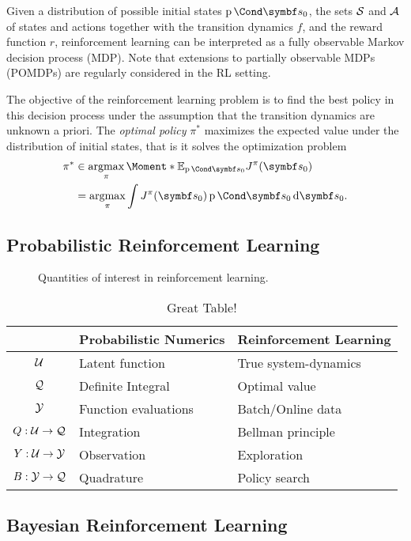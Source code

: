 Given a distribution of possible initial states $\Prob{\mat{s}_0}$, the sets $\mathcal{S}$ and $\mathcal{A}$ of states and actions together with the transition dynamics $f$, and the reward function $r$, reinforcement learning can be interpreted as a fully observable Markov decision process (MDP).
Note that extensions to partially observable MDPs (POMDPs) are regularly considered in the RL setting.

The objective of the reinforcement learning problem is to find the best policy in this decision process under the assumption that the transition dynamics are unknown a priori.
The \emph{optimal policy} $\pi^*$ maximizes the expected value under the distribution of initial states, that is it solves the optimization problem
\begin{align}
    \label{eq:optimal_policy}
    \begin{split}
        \pi^\ast &\in \argmax_{\pi} \Moment*{\E_{\Prob{\mat{s}_0}}}{J^\pi(\mat{s}_0)} \\
        &= \argmax_{\pi} \int J^\pi(\mat{s}_0) \Prob{\mat{s}_0} \diff \mat{s}_0.
    \end{split}
\end{align}


\subsection{Probabilistic Reinforcement Learning}
\label{sub:probabilistic_reinforcement_learning}
\begin{figure}[t]
    \centering
    
    \caption[Quantities of interest in reinforcement learning]{
        Quantities of interest in reinforcement learning.
        \label{fig:quantities_of_interest_rl}
    }
\end{figure}
\begin{table}[t]
    \centering
    \caption{Great Table!}
    \label{tab:label}
    \begin{tabularx}{\textwidth}{cYY}
        \toprule
        & Probabilistic Numerics & Reinforcement Learning \\
        \midrule
        $\mathcal{U}$ & Latent function & True system-dynamics \\
        $\mathcal{Q}$ & Definite Integral & Optimal value \\
        $\mathcal{Y}$ & Function evaluations & Batch/Online data \\
        \midrule
        $Q : \mathcal{U} \to \mathcal{Q}$ & Integration & Bellman principle \\
        $Y : \mathcal{U} \to \mathcal{Y}$ & Observation & Exploration \\
        $B : \mathcal{Y} \to \mathcal{Q}$ & Quadrature & Policy search \\
        \bottomrule
    \end{tabularx}
\end{table}


\subsection{Bayesian Reinforcement Learning}
\label{sub:bayesian_reinforcement_learning}
